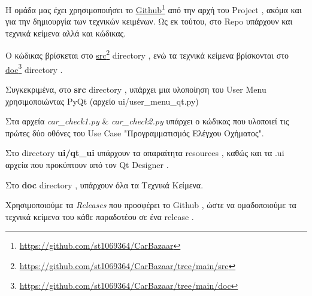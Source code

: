 \documentclass{../ol-softwaremanual}
\newcommand{\doclink}[2]{\href{#1}{#2}\footnote{\url{#1}}}
\begin{document}
	
	\newpage
	
	
	
	\flushleft
	
	Η ομάδα μας έχει χρησιμοποιήσει το \en \doclink{https://github.com/st1069364/CarBazaar}{Github} \gr από την αρχή του \en Project \gr, ακόμα και για την δημιουργία των τεχνικών κειμένων. Ως εκ τούτου, στο \en Repo \gr υπάρχουν και τεχνικά κείμενα αλλά και κώδικας. \break
	
	
	Ο κώδικας βρίσκεται στο \en \doclink{https://github.com/st1069364/CarBazaar/tree/main/src}{src} directory \gr, ενώ τα τεχνικά κείμενα βρίσκονται στο \en \doclink{https://github.com/st1069364/CarBazaar/tree/main/doc}{doc} directory \gr .\break
	
	Συγκεκριμένα, στο \en \textbf{src} directory \gr, υπάρχει μια υλοποίηση του \en User Menu \gr χρησιμοποιώντας \en PyQt \gr (αρχείο \en ui/user\_menu\_qt.py) \gr \break
	
	 \break
	
	Στα αρχεία \en \textit{car\_check1.py} \& \textit{car\_check2.py} \gr υπάρχει ο κώδικας που υλοποιεί τις πρώτες δύο οθόνες του \en Use Case "\gr Προγραμματισμός Ελέγχου Οχήματος\en"\gr. \break 
	
	\break
	
	Στο \en directory \textbf{ui/qt\_ui} \gr υπάρχουν τα απαραίτητα \en resources \gr, καθώς και τα \en .ui \gr αρχεία που προκύπτουν από τον \en Qt Designer \gr. \break	
	
	
	Στο \en \textbf{doc} directory \gr, υπάρχουν όλα τα Τεχνικά Κείμενα. \break
	
	Χρησιμοποιούμε τα \en \textit{Releases} \gr που προσφέρει το \en Github \gr, ώστε να ομαδοποιούμε τα τεχνικά κείμενα του κάθε παραδοτέου σε ένα \en release \gr .
	
	
	
	
	
	
	
	
	
	
\end{document}
